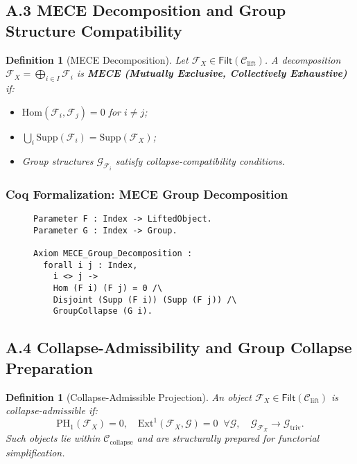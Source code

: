 \documentclass[11pt]{article}
\newtheorem{definition}[theorem]{Definition}
\begin{document}
\subsection*{A.3 MECE Decomposition and Group Structure Compatibility}

\begin{definition}[MECE Decomposition]
Let \( \mathcal{F}_X \in \mathsf{Filt}(\mathcal{C}_{\mathrm{lift}}) \). A decomposition \( \mathcal{F}_X = \bigoplus_{i \in I} \mathcal{F}_i \) is \textbf{MECE (Mutually Exclusive, Collectively Exhaustive)} if:

\begin{itemize}
    \item \( \mathrm{Hom}(\mathcal{F}_i, \mathcal{F}_j) = 0 \) for \( i \neq j \);
    \item \( \bigcup_i \mathrm{Supp}(\mathcal{F}_i) = \mathrm{Supp}(\mathcal{F}_X) \);
    \item Group structures \( \mathcal{G}_{\mathcal{F}_i} \) satisfy collapse-compatibility conditions.
\end{itemize}
\end{definition}

\subsubsection*{Coq Formalization: MECE Group Decomposition}

\begin{figure}[h]
\centering
\begin{lstlisting}[language=Coq, caption=Group-Compatible MECE Decomposition]
Parameter F : Index -> LiftedObject.
Parameter G : Index -> Group.

Axiom MECE_Group_Decomposition :
  forall i j : Index,
    i <> j ->
    Hom (F i) (F j) = 0 /\
    Disjoint (Supp (F i)) (Supp (F j)) /\
    GroupCollapse (G i).
\end{lstlisting}
\end{figure}


\subsection*{A.4 Collapse-Admissibility and Group Collapse Preparation}

\begin{definition}[Collapse-Admissible Projection]
An object \( \mathcal{F}_X \in \mathsf{Filt}(\mathcal{C}_{\mathrm{lift}}) \) is \emph{collapse-admissible} if:
\[
\mathrm{PH}_1(\mathcal{F}_X) = 0, \quad \mathrm{Ext}^1(\mathcal{F}_X, \mathcal{G}) = 0 \;\; \forall \mathcal{G}, \quad \mathcal{G}_{\mathcal{F}_X} \longrightarrow \mathcal{G}_{\mathrm{triv}}.
\]
Such objects lie within \( \mathcal{C}_{\mathrm{collapse}} \) and are structurally prepared for functorial simplification.
\end{definition}
\end{document}
